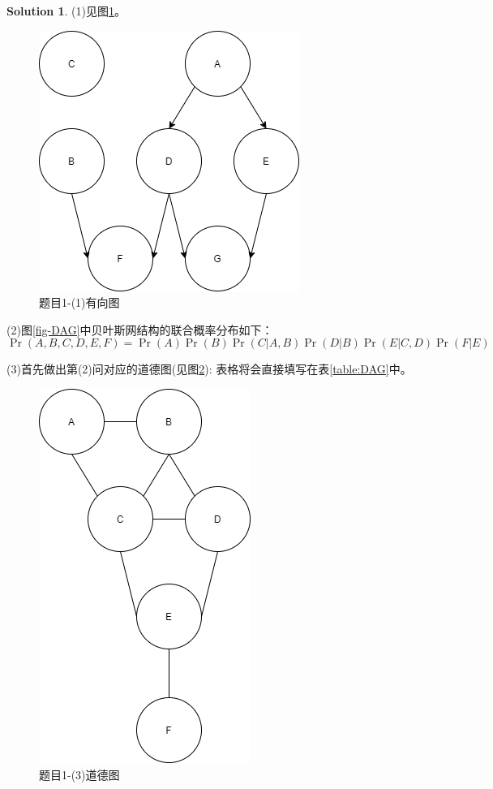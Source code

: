 \documentclass[a4paper,UTF8]{article}
\theoremstyle{definition}
\newtheorem*{solution}{Solution}
\begin{document}
\begin{solution}
\phantom{此处用于写解答(中英文均可)}

(1)见图\ref{fig-lpr}。
\begin{figure}[h]
\centering
\includegraphics[scale=0.5]{Untitled2.png}
\caption{题目1-(1)有向图}
\label{fig-lpr}
\end{figure}

(2)图\ref{fig-DAG}中贝叶斯网结构的联合概率分布如下：
\begin{equation*}
\Pr(A,B,C,D,E,F) = \Pr(A)\Pr(B)\Pr(C|A,B)\Pr(D|B)\Pr(E|C,D)\Pr(F|E)
\end{equation*}

(3)首先做出第(2)问对应的道德图(见图\ref{fig-lpr1}):
表格将会直接填写在表\ref{table:DAG}中。
\begin{figure}[h]
\centering
\includegraphics[scale=0.4]{Untitled.png}
\caption{题目1-(3)道德图}
\label{fig-lpr1}
\end{figure}
\end{solution}
\end{document}

